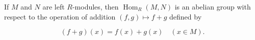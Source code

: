 If $M$ and $N$ are left $R$-modules, then $\operatorname{Hom}_R(M, N)$ is an abelian group with respect to the operation of addition $(f, g) \mapsto f + g$ defined by

$$(f + g)(x) = f(x) + g(x) \quad (x \in M).$$
